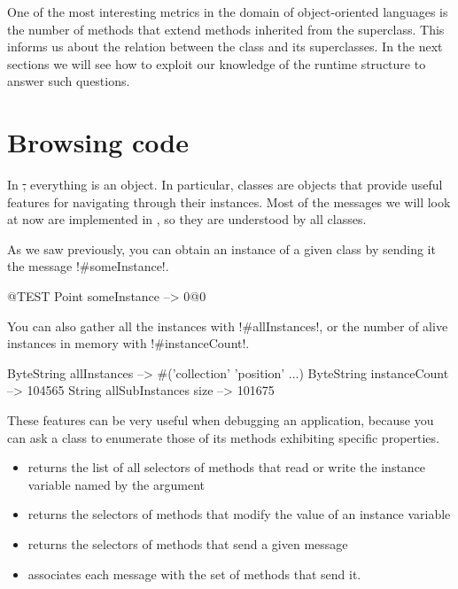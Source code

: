 \documentclass[a4paper,10pt,twoside]{book}
\begin{document}
One of the most interesting metrics in the domain of object-oriented languages is the number of methods that extend methods inherited from the superclass.
This informs us about the relation between the class and its superclasses.
In the next sections we will see how to exploit our knowledge of the runtime structure to answer such questions.

\section{Browsing code}

In \st, everything is an object. In particular, classes are objects that provide useful features for navigating through their instances.
Most of the messages we will look at now are implemented in , so they are understood by all classes.

As we saw previously, you can obtain an instance of a given class by sending it the message \ct!#someInstance!.
\begin{code}{@TEST} %
Point someInstance --> 0@0
\end{code}

You can also gather all the instances with \ct!#allInstances!, or the number of alive instances in memory with \ct!#instanceCount!.

\begin{code}{} %
ByteString allInstances        --> #('collection' 'position'  ...)
ByteString instanceCount    --> 104565
String allSubInstances size -->  101675
\end{code}

These features can be very useful when debugging an application, because you can ask a class to enumerate those of its methods exhibiting specific properties.
\begin{itemize}
\item {} returns the list of all selectors of methods that read or write the instance variable named by the argument
\item {} returns the selectors of methods that modify the value of an instance variable
\item {} returns the selectors of methods that send a given message
\item {} associates each message with the set of methods that send it.
\end{itemize}
\end{document}
